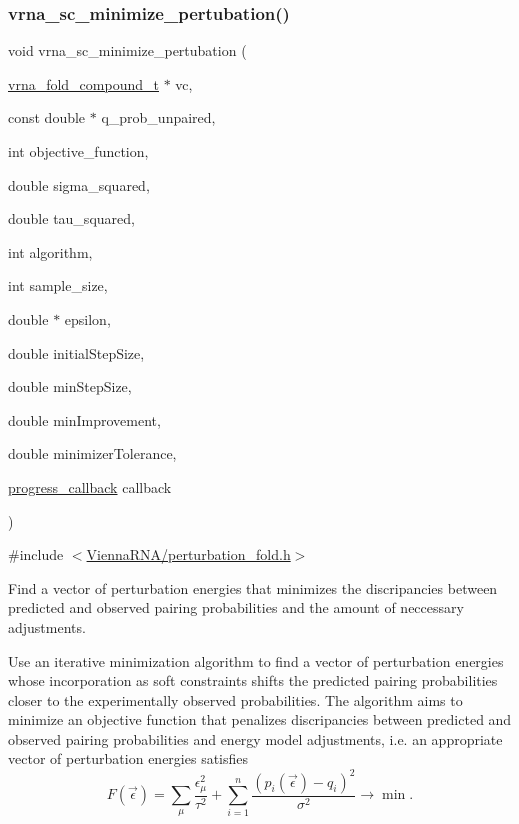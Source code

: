 \subsubsection{\texorpdfstring{vrna\_sc\_minimize\_pertubation()}{vrna\_sc\_minimize\_pertubation()}}
{\footnotesize\ttfamily void vrna\+\_\+sc\+\_\+minimize\+\_\+pertubation (\begin{DoxyParamCaption}\item[{\mbox{\hyperlink{group__fold__compound_ga1b0cef17fd40466cef5968eaeeff6166}{vrna\+\_\+fold\+\_\+compound\+\_\+t}} $\ast$}]{vc,  }\item[{const double $\ast$}]{q\+\_\+prob\+\_\+unpaired,  }\item[{int}]{objective\+\_\+function,  }\item[{double}]{sigma\+\_\+squared,  }\item[{double}]{tau\+\_\+squared,  }\item[{int}]{algorithm,  }\item[{int}]{sample\+\_\+size,  }\item[{double $\ast$}]{epsilon,  }\item[{double}]{initial\+Step\+Size,  }\item[{double}]{min\+Step\+Size,  }\item[{double}]{min\+Improvement,  }\item[{double}]{minimizer\+Tolerance,  }\item[{\mbox{\hyperlink{group__perturbation_gaa715397c7afd2d2955c315512a3d571a}{progress\+\_\+callback}}}]{callback }\end{DoxyParamCaption})}



{\ttfamily \#include $<$\mbox{\hyperlink{perturbation__fold_8h}{Vienna\+R\+N\+A/perturbation\+\_\+fold.\+h}}$>$}



Find a vector of perturbation energies that minimizes the discripancies between predicted and observed pairing probabilities and the amount of neccessary adjustments. 

Use an iterative minimization algorithm to find a vector of perturbation energies whose incorporation as soft constraints shifts the predicted pairing probabilities closer to the experimentally observed probabilities. The algorithm aims to minimize an objective function that penalizes discripancies between predicted and observed pairing probabilities and energy model adjustments, i.\+e. an appropriate vector of perturbation energies satisfies \[ F(\vec\epsilon) = \sum_{\mu}{ \frac{\epsilon_{\mu}^2}{\tau^2} } + \sum_{i = 1}^n{ \frac{(p_i(\vec\epsilon) - q_i)^2}{\sigma^2} } \to \min. \]

